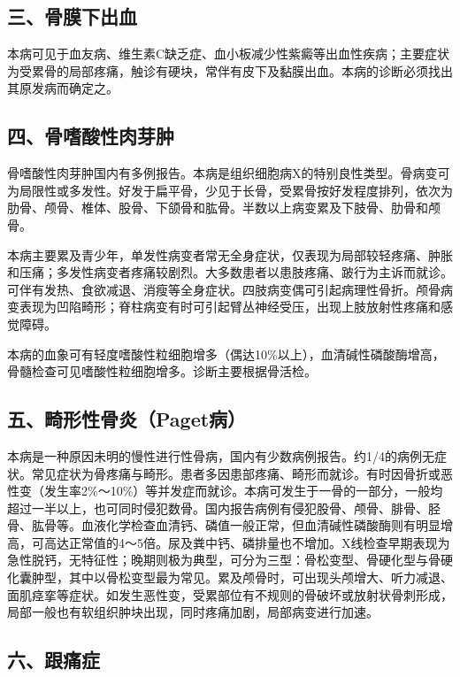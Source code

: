 \subsection{三、骨膜下出血}

本病可见于血友病、维生素C缺乏症、血小板减少性紫癜等出血性疾病；主要症状为受累骨的局部疼痛，触诊有硬块，常伴有皮下及黏膜出血。本病的诊断必须找出其原发病而确定之。

\subsection{四、骨嗜酸性肉芽肿}

骨嗜酸性肉芽肿国内有多例报告。本病是组织细胞病X的特别良性类型。骨病变可为局限性或多发性。好发于扁平骨，少见于长骨，受累骨按好发程度排列，依次为肋骨、颅骨、椎体、股骨、下颌骨和肱骨。半数以上病变累及下肢骨、肋骨和颅骨。

本病主要累及青少年，单发性病变者常无全身症状，仅表现为局部较轻疼痛、肿胀和压痛；多发性病变者疼痛较剧烈。大多数患者以患肢疼痛、跛行为主诉而就诊。可伴有发热、食欲减退、消瘦等全身症状。四肢病变偶可引起病理性骨折。颅骨病变表现为凹陷畸形；脊柱病变有时可引起臂丛神经受压，出现上肢放射性疼痛和感觉障碍。

本病的血象可有轻度嗜酸性粒细胞增多（偶达10\%以上），血清碱性磷酸酶增高，骨髓检查可见嗜酸性粒细胞增多。诊断主要根据骨活检。

\subsection{五、畸形性骨炎（Paget病）}

本病是一种原因未明的慢性进行性骨病，国内有少数病例报告。约1/4的病例无症状。常见症状为骨疼痛与畸形。患者多因患部疼痛、畸形而就诊。有时因骨折或恶性变（发生率2\%～10\%）等并发症而就诊。本病可发生于一骨的一部分，一般均超过一半以上，也可同时侵犯数骨。国内报告病例有侵犯股骨、颅骨、腓骨、胫骨、肱骨等。血液化学检查血清钙、磷值一般正常，但血清碱性磷酸酶则有明显增高，可高达正常值的4～5倍。尿及粪中钙、磷排量也不增加。X线检查早期表现为急性脱钙，无特征性；晚期则极为典型，可分为三型：骨松变型、骨硬化型与骨硬化囊肿型，其中以骨松变型最为常见。累及颅骨时，可出现头颅增大、听力减退、面肌痉挛等症状。如发生恶性变，受累部位有不规则的骨破坏或放射状骨刺形成，局部一般也有软组织肿块出现，同时疼痛加剧，局部病变进行加速。

\subsection{六、跟痛症}

